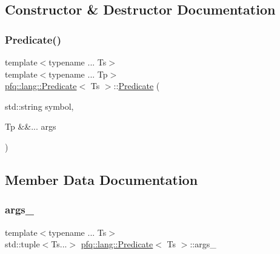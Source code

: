 \subsection{Constructor \& Destructor Documentation}
\mbox{\label{structpfq_1_1lang_1_1Predicate_ad604e102c7599051e801d790cca70591}} 
\subsubsection{\texorpdfstring{Predicate()}{Predicate()}}
{\footnotesize\ttfamily template$<$typename ... Ts$>$ \\
template$<$typename ... Tp$>$ \\
\hyperlink{structpfq_1_1lang_1_1Predicate}{pfq\+::lang\+::\+Predicate}$<$ Ts $>$\+::\hyperlink{structpfq_1_1lang_1_1Predicate}{Predicate} (\begin{DoxyParamCaption}\item[{std\+::string}]{symbol,  }\item[{Tp \&\&...}]{args }\end{DoxyParamCaption})\hspace{0.3cm}{\ttfamily [inline]}}



\subsection{Member Data Documentation}
\mbox{\label{structpfq_1_1lang_1_1Predicate_aee302feb9cdf55566e50249e6dcd50af}} 
\subsubsection{\texorpdfstring{args\+\_\+}{args\_}}
{\footnotesize\ttfamily template$<$typename ... Ts$>$ \\
std\+::tuple$<$Ts...$>$ \hyperlink{structpfq_1_1lang_1_1Predicate}{pfq\+::lang\+::\+Predicate}$<$ Ts $>$\+::args\+\_\+}

\mbox{\label{structpfq_1_1lang_1_1Predicate_a5f3219d34d216f1af9f6b1cafb93cc62}} 
